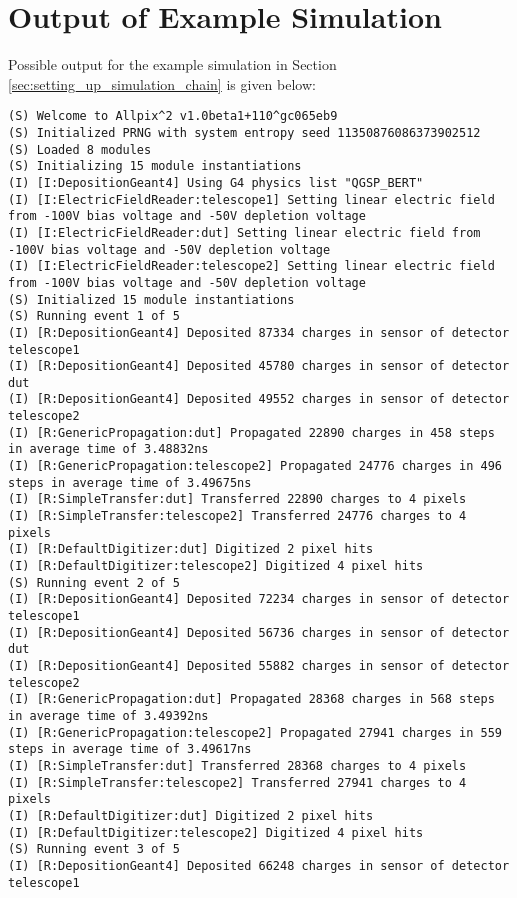 \section{Output of Example Simulation}
\label{sec:example_output}
Possible output for the example simulation in Section \ref{sec:setting_up_simulation_chain} is given below:

\begin{lstlisting}[breaklines]
(S) Welcome to Allpix^2 v1.0beta1+110^gc065eb9
(S) Initialized PRNG with system entropy seed 11350876086373902512
(S) Loaded 8 modules
(S) Initializing 15 module instantiations
(I) [I:DepositionGeant4] Using G4 physics list "QGSP_BERT"
(I) [I:ElectricFieldReader:telescope1] Setting linear electric field from -100V bias voltage and -50V depletion voltage
(I) [I:ElectricFieldReader:dut] Setting linear electric field from -100V bias voltage and -50V depletion voltage
(I) [I:ElectricFieldReader:telescope2] Setting linear electric field from -100V bias voltage and -50V depletion voltage
(S) Initialized 15 module instantiations
(S) Running event 1 of 5
(I) [R:DepositionGeant4] Deposited 87334 charges in sensor of detector telescope1
(I) [R:DepositionGeant4] Deposited 45780 charges in sensor of detector dut
(I) [R:DepositionGeant4] Deposited 49552 charges in sensor of detector telescope2
(I) [R:GenericPropagation:dut] Propagated 22890 charges in 458 steps in average time of 3.48832ns
(I) [R:GenericPropagation:telescope2] Propagated 24776 charges in 496 steps in average time of 3.49675ns
(I) [R:SimpleTransfer:dut] Transferred 22890 charges to 4 pixels
(I) [R:SimpleTransfer:telescope2] Transferred 24776 charges to 4 pixels
(I) [R:DefaultDigitizer:dut] Digitized 2 pixel hits
(I) [R:DefaultDigitizer:telescope2] Digitized 4 pixel hits
(S) Running event 2 of 5
(I) [R:DepositionGeant4] Deposited 72234 charges in sensor of detector telescope1
(I) [R:DepositionGeant4] Deposited 56736 charges in sensor of detector dut
(I) [R:DepositionGeant4] Deposited 55882 charges in sensor of detector telescope2
(I) [R:GenericPropagation:dut] Propagated 28368 charges in 568 steps in average time of 3.49392ns
(I) [R:GenericPropagation:telescope2] Propagated 27941 charges in 559 steps in average time of 3.49617ns
(I) [R:SimpleTransfer:dut] Transferred 28368 charges to 4 pixels
(I) [R:SimpleTransfer:telescope2] Transferred 27941 charges to 4 pixels
(I) [R:DefaultDigitizer:dut] Digitized 2 pixel hits
(I) [R:DefaultDigitizer:telescope2] Digitized 4 pixel hits
(S) Running event 3 of 5
(I) [R:DepositionGeant4] Deposited 66248 charges in sensor of detector telescope1

\end{lstlisting}
